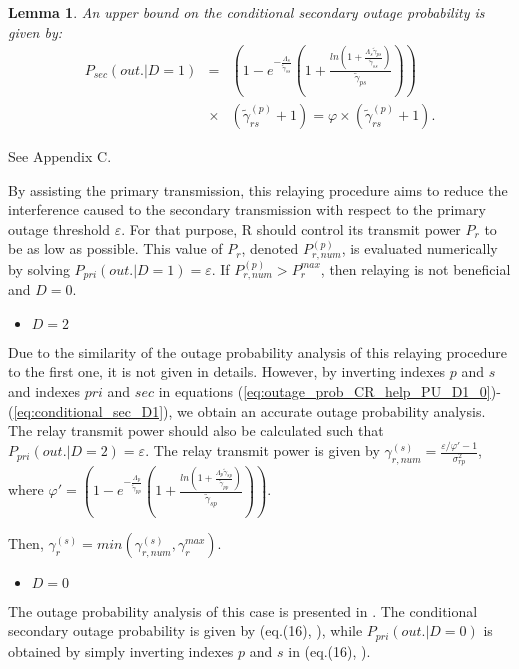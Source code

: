 \documentclass[conference,twocolumn]{IEEEtran}
\newtheorem{Lemma}{Lemma}
\begin{document}
\begin{Lemma}
An upper bound on the conditional secondary outage probability is given by:
\label{Lemma2}
\begin{eqnarray}
\label{eq:conditional_sec_D1}
\nonumber P_{sec}(out.|D=1)&=& \left( 1-e^{-\frac{\Lambda_s}{\tilde{\gamma}_{ss}}}\left( 1+\frac{ln\left( 1+ \frac{\Lambda_s \tilde{\gamma}_{ps}}{\tilde{\gamma}_{ss}} \right)}{\tilde{\gamma}_{ps}} \right)  \right)\\
&\times& \left( \tilde{\gamma}_{rs}^{(p)} +1 \right)=\varphi \times \left( \tilde{\gamma}_{rs}^{(p)} +1 \right).
\end{eqnarray}
\end{Lemma}
\begin{IEEEproof} See Appendix C.
\end{IEEEproof}

By assisting the primary transmission, this relaying procedure aims to reduce the interference caused to the secondary transmission with respect to the primary outage threshold $\varepsilon$. For that purpose, R should control its transmit power $P_r$ to be as low as possible. This value of $P_r$, denoted $P_{r,num}^{(p)}$, is evaluated numerically by solving $P_{pri}(out.|D=1)=\varepsilon$. If $P_{r,num}^{(p)}>P_r^{max}$, then relaying is not beneficial and $D=0$.

\begin{itemize}
  \item $D=2$
\end{itemize}
Due to the similarity of the outage probability analysis of this relaying procedure to the first one, it is not given in details. However, by inverting indexes $p$ and $s$ and indexes $pri$ and $sec$ in equations (\ref{eq:outage_prob_CR_help_PU_D1_0})-(\ref{eq:conditional_sec_D1}), we obtain an accurate outage probability analysis. The relay transmit power should also be calculated such that $P_{pri}(out.|D=2)=\varepsilon$. The relay transmit power is given by
$\gamma_{r,num}^{(s)}=\frac{\varepsilon/\varphi'-1}{\sigma_{rp}^2}$, where
$\varphi'=\left( 1-e^{-\frac{\Lambda_p}{\tilde{\gamma}_{pp}}}\left( 1+\frac{ln\left( 1+ \frac{\Lambda_p \tilde{\gamma}_{sp}}{\tilde{\gamma}_{pp}} \right)}{\tilde{\gamma}_{sp}} \right)  \right)$.

Then, $\gamma_r^{(s)}=min\left( \gamma_{r,num}^{(s)}, \gamma_r^{max} \right)$.




\begin{itemize}
  \item $D=0$
\end{itemize}
The outage probability analysis of this case is presented in \cite{Jaafar_Globecom}. The conditional secondary outage probability is given by (eq.(16), \cite{Jaafar_Globecom}), while $P_{pri}(out.|D=0)$ is obtained by simply inverting indexes $p$ and $s$ in (eq.(16), \cite{Jaafar_Globecom}).
\end{document}
